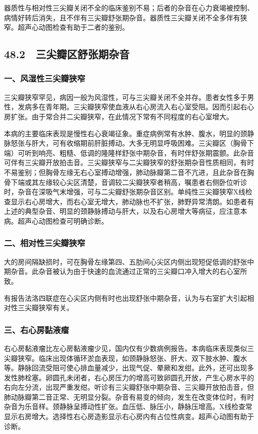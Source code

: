 器质性与相对性三尖瓣关闭不全的临床鉴别不易；后者的杂音在心力衰竭被控制、病情好转后消失，且不伴有三尖瓣舒张期杂音。器质性三尖瓣关闭不全多伴有狭窄。超声心动图检查有助于二者的鉴别。

\subsection{48.2　三尖瓣区舒张期杂音}

\subsubsection{一、风湿性三尖瓣狭窄}

三尖瓣狭窄罕见，病因一般为风湿性，可与三尖瓣关闭不全并存。患者女性多于男性，发病多在青年期。三尖瓣狭窄使血液从右心房流入右心室受阻。因而引起右心房扩张。由于常合并二尖瓣狭窄，在此情况下常有不同程度的右心室增大。

本病的主要临床表现是慢性右心衰竭征象。重症病例常有水肿、腹水，明显的颈静脉怒张与肝大，可有收缩期前肝脏搏动。大多无明显呼吸困难。三尖瓣区（胸骨下端）可听到响亮、粗糙、低调的隆隆样舒张中期杂音，有时伴舒张期震颤。此杂音可伴有三尖瓣开放拍击音。三尖瓣狭窄与二尖瓣狭窄的舒张期杂音性质相同，有时不易鉴别；但胸骨左缘无右心室搏动增强，肺动脉瓣第二音不亢进，且此杂音在胸骨下端或其左缘较心尖区清楚，音调较二尖瓣狭窄者稍高，嘱患者右侧卧位听诊时，杂音在深吸气末增强，可与二尖瓣舒张期杂音区别。单纯性三尖瓣狭窄X线检查显示右心房增大，而右心室无增大，肺动脉也不扩张，肺野异常清朗。如患者有上述的典型杂音、明显的颈静脉搏动与肝大，以及右心房增大等病征，应注意本病。超声心动图检查可明确诊断。

\subsubsection{二、相对性三尖瓣狭窄}

大的房间隔缺损时，可在胸骨左缘第四、五肋间心尖区内侧出现短促低调的舒张中期杂音。此杂音被认为由于快速的血流通过正常的三尖瓣口冲入增大的右心室所致。

有报告法洛四联症在心尖区内侧有时也出现舒张中期杂音，认为与右室扩大引起相对性三尖瓣狭窄有关。

\subsubsection{三、右心房黏液瘤}

右心房黏液瘤比左心房黏液瘤少见，国内仅有少数病例报告。本病临床表现类似三尖瓣狭窄。临床出现体循环淤血表现，如颈静脉怒张、肝大、双下肢水肿、腹水等。静脉回流受阻可使心排血量减少，出现气促、晕厥和发绀。此外，还可出现多发性肺栓塞。卵圆孔未闭者，右心房压力的增高可致卵圆孔开放，产生心房水平的右向左分流，出现严重发绀。听诊有三尖瓣舒张中期杂音、三尖瓣开放拍击音，但肺动脉瓣第二音正常、无明显分裂。杂音有易变的倾向，发生在改变体位时，有时杂音为乐音样。颈静脉呈搏动性扩张。血压低、脉压小，静脉压增高。X线检查常显示右房增大。选择性右心房造影显示右心房内有占位性病变。超声心动图有助于诊断。

